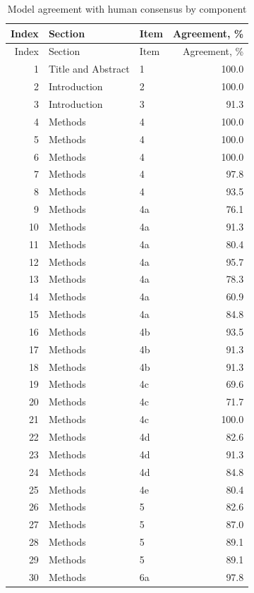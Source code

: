 \begin{longtable}{rllr}
\caption{Model agreement with human consensus by component}
\label{tab:model:accuracy} \\

\toprule
Index & Section & Item & Agreement, \% \\
\midrule
\endfirsthead

\toprule
Index & Section & Item & Agreement, \% \\
\midrule
\endhead

\bottomrule
\endfoot

1 & Title and Abstract & 1 & 100.0 \\
2 & Introduction & 2 & 100.0 \\
3 & Introduction & 3 & 91.3 \\
4 & Methods & 4 & 100.0 \\
5 & Methods & 4 & 100.0 \\
6 & Methods & 4 & 100.0 \\
7 & Methods & 4 & 97.8 \\
8 & Methods & 4 & 93.5 \\
9 & Methods & 4a & 76.1 \\
10 & Methods & 4a & 91.3 \\
11 & Methods & 4a & 80.4 \\
12 & Methods & 4a & 95.7 \\
13 & Methods & 4a & 78.3 \\
14 & Methods & 4a & 60.9 \\
15 & Methods & 4a & 84.8 \\
16 & Methods & 4b & 93.5 \\
17 & Methods & 4b & 91.3 \\
18 & Methods & 4b & 91.3 \\
19 & Methods & 4c & 69.6 \\
20 & Methods & 4c & 71.7 \\
21 & Methods & 4c & 100.0 \\
22 & Methods & 4d & 82.6 \\
23 & Methods & 4d & 91.3 \\
24 & Methods & 4d & 84.8 \\
25 & Methods & 4e & 80.4 \\
26 & Methods & 5 & 82.6 \\
27 & Methods & 5 & 87.0 \\
28 & Methods & 5 & 89.1 \\
29 & Methods & 5 & 89.1 \\
30 & Methods & 6a & 97.8 \\

\end{longtable}
